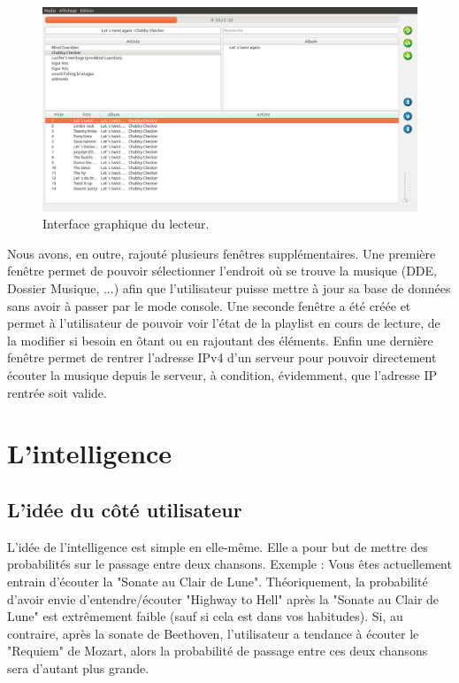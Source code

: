 \documentclass{report}
\begin{document}
\begin{figure}[h]
\centering
\includegraphics[scale=.3]{interface.png}
\caption{Interface graphique du lecteur.}
\end{figure}


Nous avons, en outre, rajouté plusieurs fenêtres supplémentaires. Une première fenêtre permet de pouvoir sélectionner l'endroit où se trouve la musique (DDE, Dossier Musique, ...) afin que l'utilisateur puisse mettre à jour sa base de données sans avoir à passer par le mode console. Une seconde fenêtre a été créée et permet à l'utilisateur de pouvoir voir l'état de la playlist en cours de lecture, de la modifier si besoin en ôtant ou en rajoutant des éléments. Enfin une dernière fenêtre permet de rentrer l'adresse IPv4 d'un serveur pour pouvoir directement écouter la musique depuis le serveur, à condition, évidemment, que l'adresse IP rentrée soit valide.

\chapter{L'intelligence}
\section{L'idée du côté utilisateur}

L'idée de l'intelligence est simple en elle-même. Elle a pour but de mettre des probabilités sur le passage entre deux chansons. Exemple : Vous êtes actuellement entrain d'écouter la "Sonate au Clair de Lune". Théoriquement, la probabilité d'avoir envie d'entendre/écouter "Highway to Hell" après la "Sonate au Clair de Lune" est extrêmement faible (sauf si cela est dans vos habitudes).
Si, au contraire, après la sonate de Beethoven, l'utilisateur a tendance à écouter le "Requiem" de Mozart, alors la probabilité de passage entre ces deux chansons sera d'autant plus grande.
\end{document}
